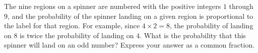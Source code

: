 The nine regions on a spinner are numbered with the positive integers $1$ through $9$, and the probability of the spinner landing on a given region is proportional to the label for that region. For example, since $4\times2=8$, the probability of landing on $8$ is twice the probability of landing on $4$. What is the probability that this spinner will land on an odd number? Express your answer as a common fraction.

